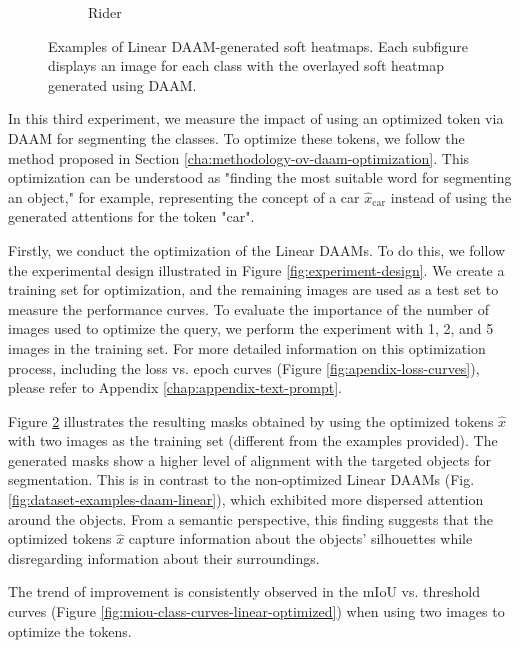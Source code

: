 \begin{figure}
\begin{subfigure}{0.24\columnwidth}
   \caption{Rider}
   \label{subfig:dataset-example-rider-daam-linear-optimized}
  \end{subfigure}
  \caption[Examples of Linear DAAM-generated soft heatmaps]{Examples of Linear DAAM-generated soft heatmaps. Each subfigure displays an image for each class with the overlayed soft heatmap generated using DAAM.}
  \label{fig:dataset-examples-daam-linear-optimized}
  \end{figure}




In this third experiment, we measure the impact of using an optimized token via DAAM for segmenting the classes. To optimize these tokens, we follow the method proposed in Section \ref{cha:methodology-ov-daam-optimization}. This optimization can be understood as "finding the most suitable word for segmenting an object," for example, representing the concept of a car $\hat{x}_{\text{car}}$ instead of using the generated attentions for the token "car".

Firstly, we conduct the optimization of the Linear DAAMs. To do this, we follow the experimental design illustrated in Figure \ref{fig:experiment-design}. We create a training set for optimization, and the remaining images are used as a test set to measure the performance curves. To evaluate the importance of the number of images used to optimize the query, we perform the experiment with 1, 2, and 5 images in the training set. For more detailed information on this optimization process, including the loss vs. epoch curves (Figure \ref{fig:apendix-loss-curves}), please refer to Appendix \ref{chap:appendix-text-prompt}.


Figure \ref{fig:dataset-examples-daam-linear-optimized} illustrates the resulting masks obtained by using the optimized tokens $\hat{x}$ with two images as the training set (different from the examples provided). The generated masks show a higher level of alignment with the targeted objects for segmentation. This is in contrast to the non-optimized Linear DAAMs (Fig. \ref{fig:dataset-examples-daam-linear}), which exhibited more dispersed attention around the objects. From a semantic perspective, this finding suggests that the optimized tokens $\hat{x}$ capture information about the objects' silhouettes while disregarding information about their surroundings.


The trend of improvement is consistently observed in the mIoU vs. threshold curves (Figure \ref{fig:miou-class-curves-linear-optimized}) when using two images to optimize the tokens.

